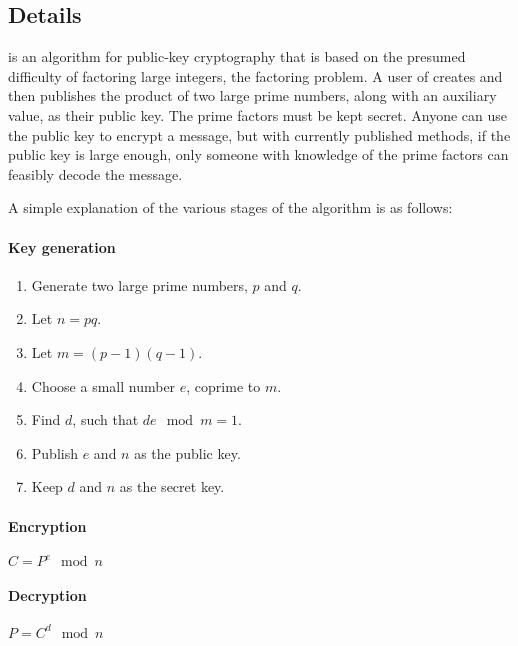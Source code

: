\documentclass[a4paper,11pt]{article}
\begin{document}
\subsection{Details}
 is an algorithm for public-key cryptography that is based on the
presumed difficulty of factoring large integers, the factoring problem. A user 
of  creates and then publishes the product of two large prime 
numbers, along with an auxiliary value, as their public key. The prime factors 
must be kept secret. Anyone can use the public key to encrypt a message, but 
with currently published methods, if the public key is large enough, only 
someone with knowledge of the prime factors can feasibly decode the message. 

A simple explanation of the various stages of the  algorithm is 
as follows:

\paragraph{Key generation}
\begin{enumerate}
\item Generate two large prime numbers, $p$ and $q$.
\item Let $n = pq$.
\item Let $m = (p-1)(q-1)$.
\item Choose a small number $e$, coprime to $m$.
\item Find $d$, such that $de \mod m = 1$.
\item Publish $e$ and $n$ as the public key.
\item Keep $d$ and $n$ as the secret key.
\end{enumerate}

\paragraph{Encryption}
\begin{math}
C = P^{e} \mod n
\end{math}

\paragraph{Decryption}
\begin{math}
P = C^{d} \mod n
\end{math}
\end{document}
